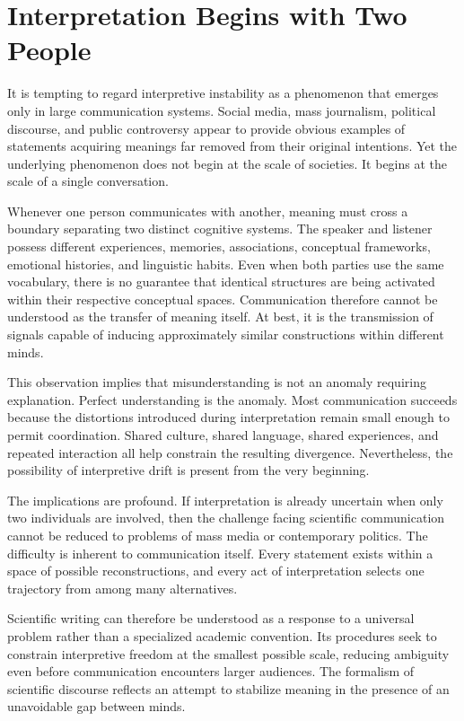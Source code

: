 \documentclass[11pt]{article}
\theoremstyle{plain}
\begin{document}
\section{Interpretation Begins with Two People}

It is tempting to regard interpretive instability as a phenomenon that emerges only in large communication systems. Social media, mass journalism, political discourse, and public controversy appear to provide obvious examples of statements acquiring meanings far removed from their original intentions. Yet the underlying phenomenon does not begin at the scale of societies. It begins at the scale of a single conversation.

Whenever one person communicates with another, meaning must cross a boundary separating two distinct cognitive systems. The speaker and listener possess different experiences, memories, associations, conceptual frameworks, emotional histories, and linguistic habits. Even when both parties use the same vocabulary, there is no guarantee that identical structures are being activated within their respective conceptual spaces. Communication therefore cannot be understood as the transfer of meaning itself. At best, it is the transmission of signals capable of inducing approximately similar constructions within different minds.

This observation implies that misunderstanding is not an anomaly requiring explanation. Perfect understanding is the anomaly. Most communication succeeds because the distortions introduced during interpretation remain small enough to permit coordination. Shared culture, shared language, shared experiences, and repeated interaction all help constrain the resulting divergence. Nevertheless, the possibility of interpretive drift is present from the very beginning.

The implications are profound. If interpretation is already uncertain when only two individuals are involved, then the challenge facing scientific communication cannot be reduced to problems of mass media or contemporary politics. The difficulty is inherent to communication itself. Every statement exists within a space of possible reconstructions, and every act of interpretation selects one trajectory from among many alternatives.

Scientific writing can therefore be understood as a response to a universal problem rather than a specialized academic convention. Its procedures seek to constrain interpretive freedom at the smallest possible scale, reducing ambiguity even before communication encounters larger audiences. The formalism of scientific discourse reflects an attempt to stabilize meaning in the presence of an unavoidable gap between minds.
\end{document}
